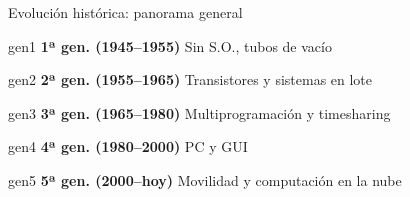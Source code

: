 \documentclass[xcolor=svgnames]{beamer}
\begin{document}
\begin{frame}{Evolución histórica: panorama general}
  \vspace{0.2cm}

  \begin{beamercolorbox}[wd=\textwidth, ht=0.55cm, dp=0.2cm, center, rounded=true]{gen1}
    \textbf{1ª gen. (1945--1955)} \quad Sin S.O., tubos de vacío
  \end{beamercolorbox}\vspace{0.15cm}

  \begin{beamercolorbox}[wd=\textwidth, ht=0.55cm, dp=0.2cm, center, rounded=true]{gen2}
    \textbf{2ª gen. (1955--1965)} \quad Transistores y sistemas en lote
  \end{beamercolorbox}\vspace{0.15cm}

  \begin{beamercolorbox}[wd=\textwidth, ht=0.55cm, dp=0.2cm, center, rounded=true]{gen3}
    \textbf{3ª gen. (1965--1980)} \quad Multiprogramación y timesharing
  \end{beamercolorbox}\vspace{0.15cm}

  \begin{beamercolorbox}[wd=\textwidth, ht=0.55cm, dp=0.2cm, center, rounded=true]{gen4}
    \textbf{4ª gen. (1980--2000)} \quad PC y GUI
  \end{beamercolorbox}\vspace{0.15cm}

  \begin{beamercolorbox}[wd=\textwidth, ht=0.55cm, dp=0.2cm, center, rounded=true]{gen5}
    \textbf{5ª gen. (2000--hoy)} \quad Movilidad y computación en la nube
  \end{beamercolorbox}
\end{frame}

\end{document}
